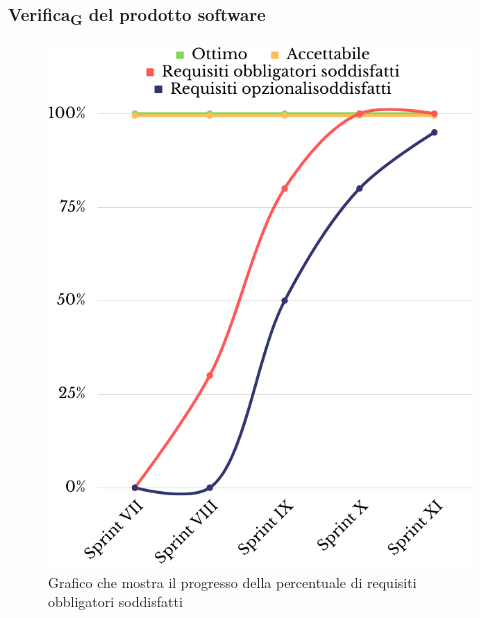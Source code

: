 \subsubsection{Verifica\textsubscript{G} del prodotto software}
\begin{figure}[H]
	\centering
	\includegraphics[scale=0.5]{img/copertura_funzionale.png}
	\caption{Grafico che mostra il progresso della percentuale di requisiti obbligatori soddisfatti}
\end{figure}
